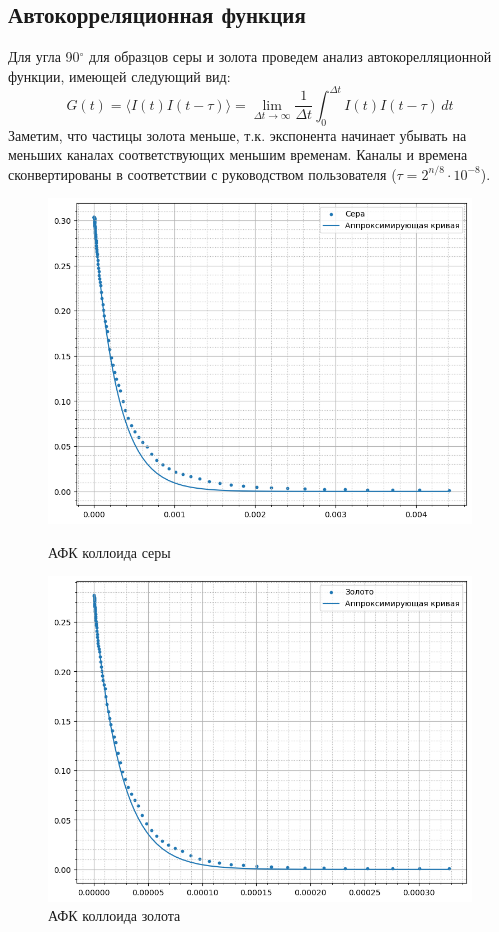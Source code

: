 \documentclass{article}
\begin{document}
\subsection{Автокорреляционная функция}
 Для угла 90$^{\circ}$ для образцов серы и золота проведем анализ автокорелляционной функции, имеющей следующий вид:
\begin{equation}
   G(t) = \langle I(t)I(t-\tau) \rangle = \lim_{\Delta t\rightarrow\infty}\frac{1}{\Delta t}\int_{0}^{\Delta t} I(t)I(t-\tau)\,dt
\end{equation}
Заметим, что частицы золота меньше, т.к. экспонента начинает убывать на меньших каналах соответствующих меньшим временам. Каналы и времена сконвертированы в соответствии с руководством пользователя ($\tau = 2^{n/8} \cdot 10^{-8}$).

\begin{figure}[!htb] 
        \centering
        \centering
            \includegraphics[width=0.7\linewidth]{Images/afk Сера.png}
                 \caption{АФК коллоида серы}
        \endminipage\hfill
        \centering
             \includegraphics[width=0.7\linewidth]{Images/afk Золото.png}
                 \caption{АФК коллоида золота}
        \endminipage
\end{figure}
\end{document}

